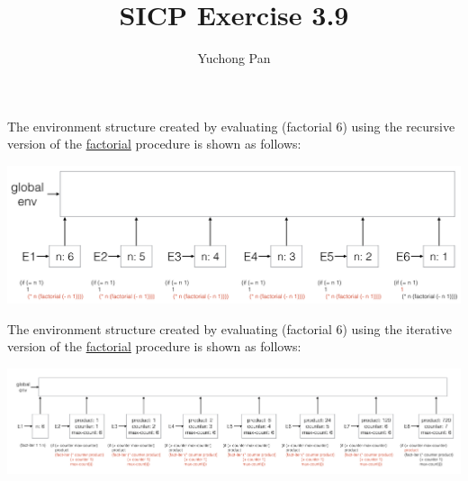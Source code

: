 \documentclass[11pt, oneside]{article}
\title{SICP Exercise 3.9}
\author{Yuchong Pan}
\begin{document}
\maketitle

The environment structure created by evaluating (factorial 6) using the recursive version of the \url{factorial} procedure is shown as follows:

\begin{center}
    \includegraphics[width=15cm]{factorial-recursive.png}
\end{center}

The environment structure created by evaluating (factorial 6) using the iterative version of the \url{factorial} procedure is shown as follows:

\begin{center}
    \includegraphics[width=15cm]{factorial-iterative.png}
\end{center}
\end{document}
